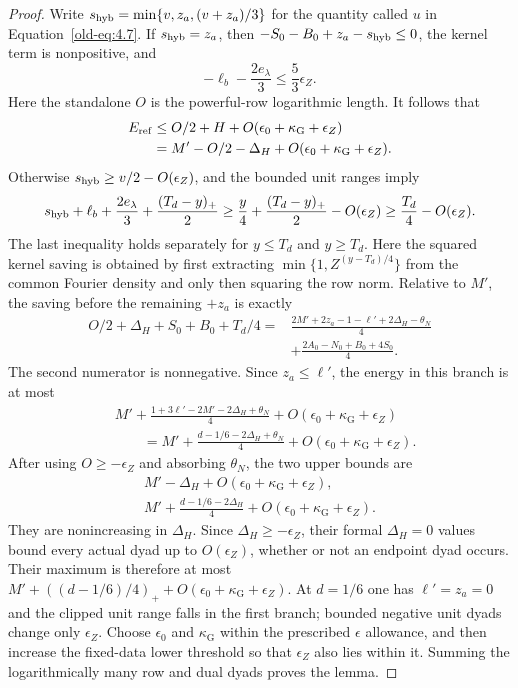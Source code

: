 \documentclass[11pt,a4paper]{article}
\numberwithin{equation}{section}
\numberwithin{figure}{section}
\theoremstyle{definition}
\theoremstyle{remark}
\begin{document}
\begin{proof}
Write $s_{\rm hyb}=\min\{v,z_a,(v+z_a)/3\}$ for the quantity
called $u$ in Equation~\eqref{old-eq:4.7}.  If $s_{\rm hyb}=z_a$,
then $-S_0-B_0+z_a-s_{\rm hyb}\le0$, the kernel term is
nonpositive, and
\[
 -\ell_b-\frac{2e_\lambda}{3}\le\frac53\epsilon_Z.
\]
Here the standalone $O$ is the powerful-row logarithmic length.  It follows that
\[
 \begin{aligned}
 E_{\rm ref}&\le O/2+H+O(\epsilon_0+\kappa_{\mathrm G}+\epsilon_Z)\\
 &=M'-O/2-\Delta_H+O(\epsilon_0+\kappa_{\mathrm G}+\epsilon_Z).
 \end{aligned}
\]
Otherwise $s_{\rm hyb}\ge v/2-O(\epsilon_Z)$, and the bounded unit
ranges imply
\[
 s_{\rm hyb}+\ell_b+\frac{2e_\lambda}{3}
       +\frac{(T_d-y)_+}{2}
 \ge \frac y4+\frac{(T_d-y)_+}{2}-O(\epsilon_Z)
 \ge \frac{T_d}{4}-O(\epsilon_Z).
\]
The last inequality holds separately for $y\le T_d$ and $y\ge T_d$.
Here the squared kernel saving is obtained by first extracting
$\min\{1,Z^{(y-T_d)/4}\}$ from the common Fourier density and only
then squaring the row norm.  Relative to $M'$, the saving
before the remaining $+z_a$ is exactly
\begin{equation}
 \begin{split}
 O/2+\Delta_H+S_0+B_0+T_d/4
 ={}&\frac{2M'+2z_a-1-\ell'+2\Delta_H-\theta_N}{4}\\
    &+\frac{2A_0-N_0+B_0+4S_0}{4}.
 \end{split}
 \label{old-eq:5.3}
\end{equation}
The second numerator is nonnegative.  Since $z_a\le\ell'$, the
energy in this branch is at most
\[
 \begin{aligned}
 &M'+\frac{1+3\ell'-2M'-2\Delta_H+\theta_N}{4}
       +O(\epsilon_0+\kappa_{\mathrm G}+\epsilon_Z)\\
 &\qquad=M'+\frac{d-1/6-2\Delta_H+\theta_N}{4}
       +O(\epsilon_0+\kappa_{\mathrm G}+\epsilon_Z).
 \end{aligned}
\]
After using $O\ge-\epsilon_Z$ and absorbing $\theta_N$, the two
upper bounds are
\[
 \begin{gathered}
 M'-\Delta_H+O(\epsilon_0+\kappa_{\mathrm G}+\epsilon_Z),\\
 M'+\frac{d-1/6-2\Delta_H}{4}
       +O(\epsilon_0+\kappa_{\mathrm G}+\epsilon_Z).
 \end{gathered}
\]
They are nonincreasing in $\Delta_H$.  Since
$\Delta_H\ge-\epsilon_Z$, their formal $\Delta_H=0$ values bound
every actual dyad up to $O(\epsilon_Z)$, whether or not an endpoint
dyad occurs.  Their maximum is therefore at most
$M'+((d-1/6)/4)_++O(\epsilon_0+\kappa_{\mathrm G}+\epsilon_Z)$.
At $d=1/6$ one has $\ell'=z_a=0$ and the clipped unit range falls
in the first branch; bounded negative unit dyads change only
$\epsilon_Z$.  Choose $\epsilon_0$ and $\kappa_{\mathrm G}$ within the prescribed
$\epsilon$ allowance, and then increase the fixed-data lower
threshold so that $\epsilon_Z$ also lies within it.  Summing the
logarithmically many row and dual dyads proves the lemma.
\end{proof}
\end{document}
